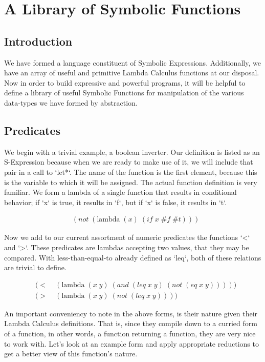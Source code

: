 
\chapter{A Library of Symbolic Functions}
\section{Introduction}
We have formed a language constituent of Symbolic Expressions. Additionally, we 
have an array of useful and primitive Lambda Calculus functions at our disposal. 
Now in order to build expressive and powerful programs, it will be helpful to 
define a library of useful Symbolic Functions for manipulation of the various 
data-types we have formed by abstraction.

\section{Predicates}
We begin with a trivial example, a boolean inverter. Our definition is listed as 
an S-Expression because when we are ready to make use of it, we will include that 
pair in a call to `let*`. The name of the function is the first element, because 
this is the variable to which it will be assigned. The actual function definition 
is very familiar. We form a lambda of a single function that results in 
conditional behavior; if `x` is true, it results in `f`, but if `x` is false, it 
results in `t`.

\begin{align*}
& (not \; (\text{lambda} \; (x) \; (if \; x \; \#f \; \#t)))
\end{align*}

Now we add to our current assortment of numeric predicates the functions `<` and 
`>`. These predicates are lambdas accepting two values, that they may be compared. 
With less-than-equal-to already defined as `leq`, both of these relations are 
trivial to define.

\begin{align*}
& (< \; &(\text{lambda} \; (x \; y) \; (and \; (leq \; x \; y) \; (not \; (eq \; x \; y)))))
\\& (> \; &(\text{lambda} \; (x \; y) \; (not \; (leq \; x \; y))))
\end{align*}

An important conveniency to note in the above forms, is their nature given their 
Lambda Calculus definitions. That is, since they compile down to a curried form of 
a function, in other words, a function returning a function, they are very nice to 
work with. Let's look at an example form and apply appropriate reductions to get a 
better view of this function's nature.

